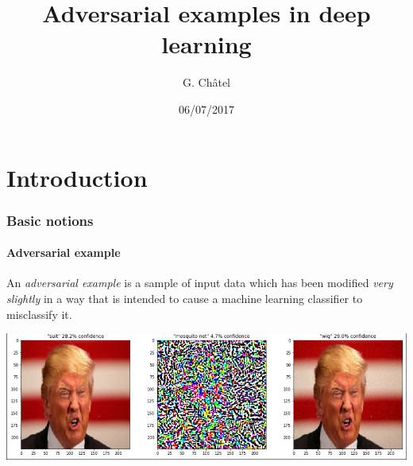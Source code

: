 \documentclass[9pt]{beamer}
\title{Adversarial examples in deep learning}
\author{G. Châtel}
\date{06/07/2017}
\begin{document}
\begin{frame}

  \maketitle

\end{frame}

\begin{frame}

  \tableofcontents

\end{frame}

\section{Introduction}

\begin{frame}
  \frametitle{Basic notions}

  \framesubtitle{Adversarial example}

  An \emph{adversarial example} is a sample of input data which has
  been modified \emph{very slightly} in a way that is intended to
  cause a machine learning classifier to misclassify it.

  \bigskip

  \pause

  \begin{center}
    \includegraphics[trim={2pt 2pt 2pt 0}, clip, width =
      \linewidth]{images/adversarial_example_wig.png}
  \end{center}

\end{frame}
\end{document}
